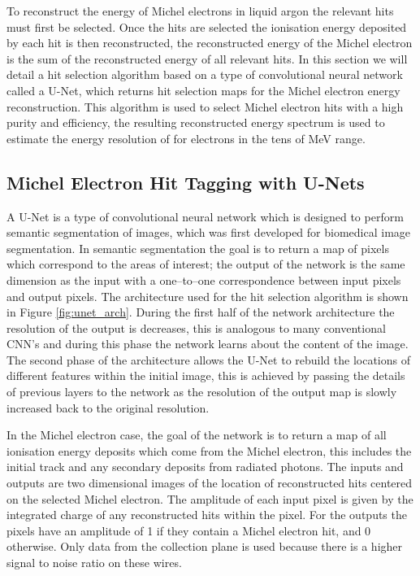 To reconstruct the energy of Michel electrons in liquid argon the relevant hits
must first be selected. Once the hits are selected the ionisation energy
deposited by each hit is then reconstructed, the reconstructed energy of the 
Michel electron is the sum of the reconstructed energy of all relevant hits. In
this section we will detail a hit selection algorithm based on a type of
convolutional neural network called a U-Net, which returns hit selection maps 
for the Michel electron energy reconstruction. This algorithm is used to select 
Michel electron hits with a high purity and efficiency, the resulting 
reconstructed energy spectrum is used to estimate the energy resolution of 
\protodune{} for electrons in the tens of MeV range.

\subsection{Michel Electron Hit Tagging with U-Nets}

A U-Net is a type of convolutional neural network which is designed to perform
semantic segmentation of images, which was first developed for biomedical image
segmentation\cite{ronneberger2015u}. In semantic segmentation the goal
is to return a map of pixels which correspond to the areas of interest; the 
output of the network is the same dimension as the input with a one--to--one 
correspondence between input pixels and output pixels. The architecture used 
for the hit selection algorithm is shown in Figure \ref{fig:unet_arch}. During 
the first half of the network architecture the resolution of the output is 
decreases, this is analogous to many conventional CNN's and during this phase 
the network learns about the content of the image.  The second phase of the 
architecture allows the U-Net to rebuild the locations of different features 
within the initial image, this is achieved by passing the details of previous 
layers to the network as the resolution of the output map is slowly increased 
back to the original resolution.

In the Michel electron case, the goal of the network is to return a map of all
ionisation energy deposits which come from the Michel electron, this includes
the initial track and any secondary deposits from radiated photons. The inputs
and outputs are two dimensional images of the location of reconstructed hits
centered on the selected Michel electron. The amplitude of each input pixel is 
given by the integrated charge of any reconstructed hits within the pixel. For
the outputs the pixels have an amplitude of 1 if they contain a Michel electron
hit, and 0 otherwise. Only data from the collection plane is used because there 
is a higher signal to noise ratio on these wires. 

